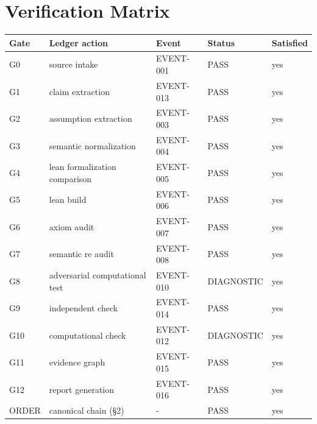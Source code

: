 \documentclass[11pt]{article}
\begin{document}
\section{Verification Matrix}
\begin{longtable}{lllll}
\toprule Gate & Ledger action & Event & Status & Satisfied \\ \midrule \endhead
G0 & source intake & EVENT-001 & PASS & yes \\
G1 & claim extraction & EVENT-013 & PASS & yes \\
G2 & assumption extraction & EVENT-003 & PASS & yes \\
G3 & semantic normalization & EVENT-004 & PASS & yes \\
G4 & lean formalization comparison & EVENT-005 & PASS & yes \\
G5 & lean build & EVENT-006 & PASS & yes \\
G6 & axiom audit & EVENT-007 & PASS & yes \\
G7 & semantic re audit & EVENT-008 & PASS & yes \\
G8 & adversarial computational test & EVENT-010 & DIAGNOSTIC & yes \\
G9 & independent check & EVENT-014 & PASS & yes \\
G10 & computational check & EVENT-012 & DIAGNOSTIC & yes \\
G11 & evidence graph & EVENT-015 & PASS & yes \\
G12 & report generation & EVENT-016 & PASS & yes \\
ORDER & canonical chain (\S{}2) & - & PASS & yes \\
\bottomrule
\end{longtable}
\end{document}
